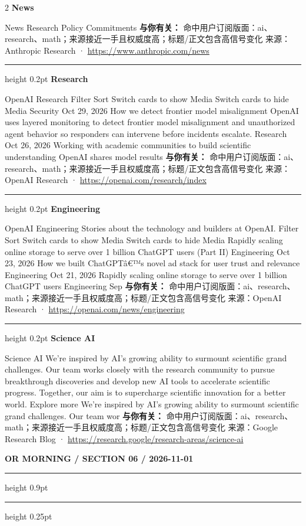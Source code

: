 \documentclass[10.5pt]{ctexart}
\begin{document}
\begin{multicols}{2}
{\large\bfseries News}\par
News Research Policy Commitments
\textbf{与你有关：} 命中用户订阅版面：ai、research、math；来源接近一手且权威度高；标题/正文包含高信号变化
{\footnotesize\color{ormuted} 来源：Anthropic Research · \url{https://www.anthropic.com/news}}
\vspace{2mm}
\hrule height 0.2pt
\vspace{2mm}
{\large\bfseries Research}\par
OpenAI Research Filter Sort Switch cards to show Media Switch cards to hide Media Security Oct 29, 2026 How we detect frontier model misalignment OpenAI uses layered monitoring to detect frontier model misalignment and unauthorized agent behavior so responders can intervene before incidents escalate. Research Oct 26, 2026 Working with academic communities to build scientific understanding OpenAI shares model results 
\textbf{与你有关：} 命中用户订阅版面：ai、research、math；来源接近一手且权威度高；标题/正文包含高信号变化
{\footnotesize\color{ormuted} 来源：OpenAI Research · \url{https://openai.com/research/index}}
\vspace{2mm}
\hrule height 0.2pt
\vspace{2mm}
{\large\bfseries Engineering}\par
OpenAI Engineering Stories about the technology and builders at OpenAI. Filter Sort Switch cards to show Media Switch cards to hide Media Rapidly scaling online storage to serve over 1 billion ChatGPT users (Part II) Engineering Oct 23, 2026 How we built ChatGPTâ€™s novel ad stack for user trust and relevance Engineering Oct 21, 2026 Rapidly scaling online storage to serve over 1 billion ChatGPT users Engineering Sep
\textbf{与你有关：} 命中用户订阅版面：ai、research、math；来源接近一手且权威度高；标题/正文包含高信号变化
{\footnotesize\color{ormuted} 来源：OpenAI Research · \url{https://openai.com/news/engineering}}
\vspace{2mm}
\hrule height 0.2pt
\vspace{2mm}
{\large\bfseries Science AI}\par
Science AI We’re inspired by AI’s growing ability to surmount scientific grand challenges. Our team works closely with the research community to pursue breakthrough discoveries and develop new AI tools to accelerate scientific progress. Together, our aim is to supercharge scientific innovation for a better world. Explore more We’re inspired by AI’s growing ability to surmount scientific grand challenges. Our team wor
\textbf{与你有关：} 命中用户订阅版面：ai、research、math；来源接近一手且权威度高；标题/正文包含高信号变化
{\footnotesize\color{ormuted} 来源：Google Research Blog · \url{https://research.google/research-areas/science-ai}}
\end{multicols}
\newpage
{\small\bfseries OR MORNING / SECTION 06 / 2026-11-01}
\vspace{2mm}
\hrule height 0.9pt
\vspace{1.5mm}
\hrule height 0.25pt
\vspace{4mm}
\end{document}
